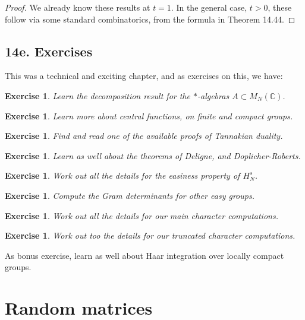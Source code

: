 \documentclass[12pt]{amsbook}
\newtheorem{exercise}[theorem]{Exercise}
\begin{document}
\begin{proof}
We already know these results at $t=1$. In the general case, $t>0$, these follow via some standard combinatorics, from the formula in Theorem 14.44.
\end{proof}

\section*{14e. Exercises}

This was a technical and exciting chapter, and as exercises on this, we have:

\begin{exercise}
Learn the decomposition result for the $*$-algebras $A\subset M_N(\mathbb C)$.
\end{exercise}

\begin{exercise}
Learn more about central functions, on finite and compact groups.
\end{exercise}

\begin{exercise}
Find and read one of the available proofs of Tannakian duality.
\end{exercise}

\begin{exercise}
Learn as well about the theorems of Deligne, and Doplicher-Roberts.
\end{exercise}

\begin{exercise}
Work out all the details for the easiness property of $H_N^s$.
\end{exercise}

\begin{exercise}
Compute the Gram determinants for other easy groups.
\end{exercise}

\begin{exercise}
Work out all the details for our main character computations.
\end{exercise}

\begin{exercise}
Work out too the details for our truncated character computations.
\end{exercise}

As bonus exercise, learn as well about Haar integration over locally compact groups.

\chapter{Random matrices}
\end{document}
